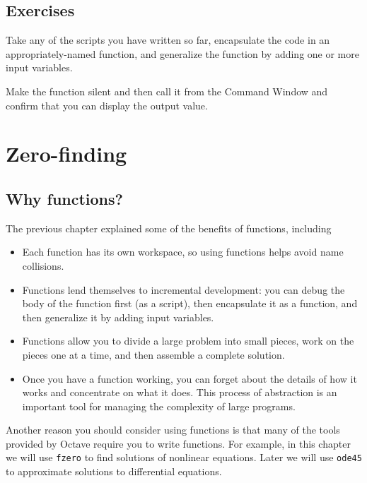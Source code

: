 \documentclass{book}
\begin{document}
\section{Exercises}

\begin{ex}
Take any of the scripts you have written so far, encapsulate
the code in an appropriately-named function, and generalize
the function by adding one or more input variables.

Make the function silent and then call it from the Command
Window and confirm that you can display the output value.
\end{ex}



\chapter{Zero-finding}


\section{Why functions?}

The previous chapter explained some of the benefits of functions,
including

\begin{itemize}

\item Each function has its own workspace, so using functions helps
avoid name collisions.

\item Functions lend themselves to incremental development: you can
debug the body of the function first (as a script), then encapsulate
it as a function, and then generalize it by adding input variables.

\item Functions allow you to divide a large problem into small
pieces, work on the pieces one at a time, and then assemble a
complete solution.

\item Once you have a function working, you can forget about the
details of how it works and concentrate on what it does. This
process of abstraction is an important tool for managing the
complexity of large programs.

\end{itemize}

Another reason you should consider using functions is that many of the
tools provided by Octave require you to write functions. For example,
in this chapter we will use {\tt fzero} to find solutions of nonlinear
equations. Later we will use {\tt ode45} to approximate solutions to
differential equations.
\end{document}

